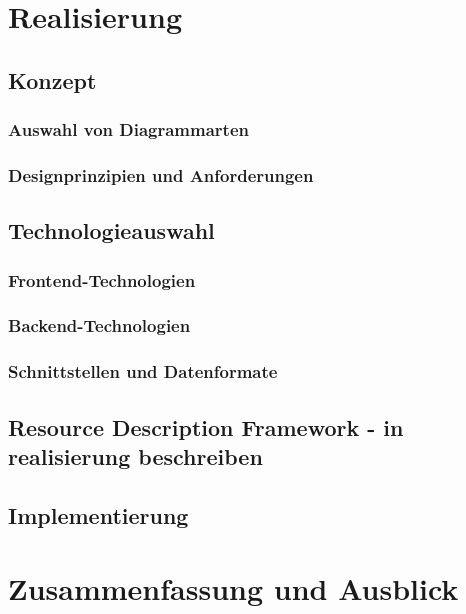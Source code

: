 
\chapter{Realisierung}

\section{Konzept}
\subsection{Auswahl von Diagrammarten}
\subsection{Designprinzipien und Anforderungen}

\section{Technologieauswahl}
\subsection{Frontend-Technologien}
\subsection{Backend-Technologien}
\subsection{Schnittstellen und Datenformate}

\section{Resource Description Framework - in realisierung beschreiben}

\section{Implementierung}

\chapter{Zusammenfassung und Ausblick}